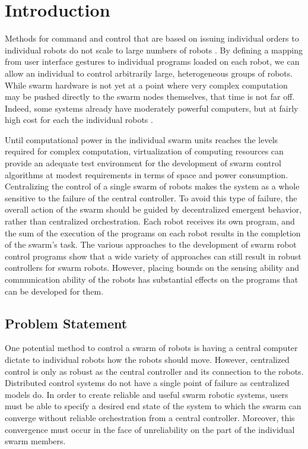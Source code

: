 \chapter{Introduction}

Methods for command and control that are based on issuing individual orders to individual robots do not scale to large numbers of robots \citep{WangSearchScale}.
By defining a mapping from user interface gestures to individual programs loaded on each robot, we can allow an individual to control arbitrarily large, heterogeneous groups of robots.
While swarm hardware is not yet at a point where very complex computation may be pushed directly to the swarm nodes themselves, that time is not far off. 
Indeed, some systems already have moderately powerful computers, but at fairly high cost for each the individual robots \citep{millard2017pi}.

Until computational power in the individual swarm units reaches the levels required for complex computation, virtualization of computing resources can provide an adequate test environment for the development of swarm control algorithms at modest requirements in terms of space and power consumption. 
Centralizing the control of a single swarm of robots makes the system as a whole sensitive to the failure of the central controller. 
To avoid this type of failure, the overall action of the swarm should be guided by decentralized emergent behavior, rather than centralized orchestration. 
Each robot receives its own program, and the sum of the execution of the programs on each robot results in the completion of the swarm's task.
The various approaches to the development of swarm robot control programs show that a wide variety of approaches can still result in robust controllers for swarm robots. 
However, placing bounds on the sensing ability and communication ability of the robots has substantial effects on the programs that can be developed for them. 

\section{Problem Statement} \label{section:Problem_Statement}

One potential method to control a swarm of robots is having a central computer dictate to individual robots how the robots should move.
However, centralized control is only as robust as the central controller and its connection to the robots. 
Distributed control systems do not have a single point of failure as centralized models do. 
In order to create reliable and useful swarm robotic systems, users must be able to specify a desired end state of the system to which the swarm can converge without reliable orchestration from a central controller. 
Moreover, this convergence must occur in the face of unreliability on the part of the individual swarm members. 

